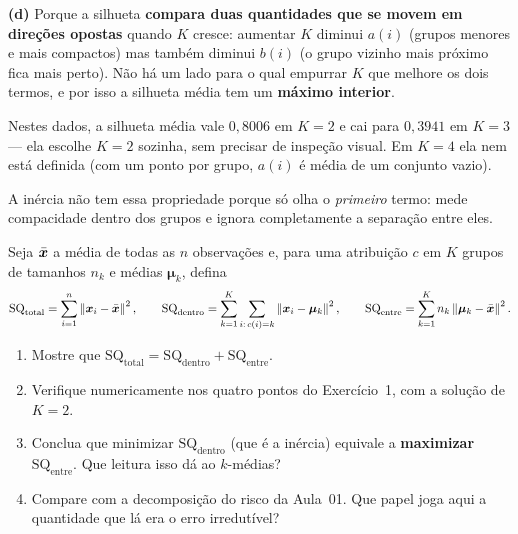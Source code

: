 \documentclass[11pt,a4paper]{article}
\begin{document}
\begin{solucao}
\smallskip
\textbf{(d)} Porque a silhueta \textbf{compara duas quantidades que se movem em
direções opostas} quando $K$ cresce: aumentar $K$ diminui $a(i)$ (grupos menores
e mais compactos) mas também diminui $b(i)$ (o grupo vizinho mais próximo fica
mais perto). Não há um lado para o qual empurrar $K$ que melhore os dois termos,
e por isso a silhueta média tem um \textbf{máximo interior}.

Nestes dados, a silhueta média vale $0{,}8006$ em $K=2$ e cai para $0{,}3941$ em
$K=3$ --- ela escolhe $K=2$ sozinha, sem precisar de inspeção visual. Em $K=4$ ela
nem está definida (com um ponto por grupo, $a(i)$ é média de um conjunto vazio).

A inércia não tem essa propriedade porque só olha o \emph{primeiro} termo: mede
compacidade dentro dos grupos e ignora completamente a separação entre eles.
\end{solucao}

\begin{exercicio}
Seja $\bar{\bm{x}}$ a média de todas as $n$ observações e, para uma atribuição $c$ em
$K$ grupos de tamanhos $n_k$ e médias $\bm\mu_k$, defina
\[
  \mathrm{SQ}_{\text{total}} = \sum_{i=1}^n\left\lVert \bm{x}_i-\bar{\bm{x}} \right\rVert^2, \qquad
  \mathrm{SQ}_{\text{dentro}} = \sum_{k=1}^{K}\sum_{i:\,c(i)=k}\left\lVert \bm{x}_i-\bm\mu_k \right\rVert^2, \qquad
  \mathrm{SQ}_{\text{entre}} = \sum_{k=1}^{K} n_k\left\lVert \bm\mu_k-\bar{\bm{x}} \right\rVert^2 .
\]
\begin{enumerate}[label=(\alph*),leftmargin=1.1cm]
  \item Mostre que
        $\mathrm{SQ}_{\text{total}} = \mathrm{SQ}_{\text{dentro}} + \mathrm{SQ}_{\text{entre}}$.
  \item Verifique numericamente nos quatro pontos do Exercício~1, com a solução
        de $K=2$.
  \item Conclua que minimizar $\mathrm{SQ}_{\text{dentro}}$ (que é a inércia)
        equivale a \textbf{maximizar} $\mathrm{SQ}_{\text{entre}}$. Que leitura
        isso dá ao $k$-médias?
  \item Compare com a decomposição do risco da Aula~01. Que papel joga aqui a
        quantidade que lá era o erro irredutível?
\end{enumerate}
\end{exercicio}
\end{document}
